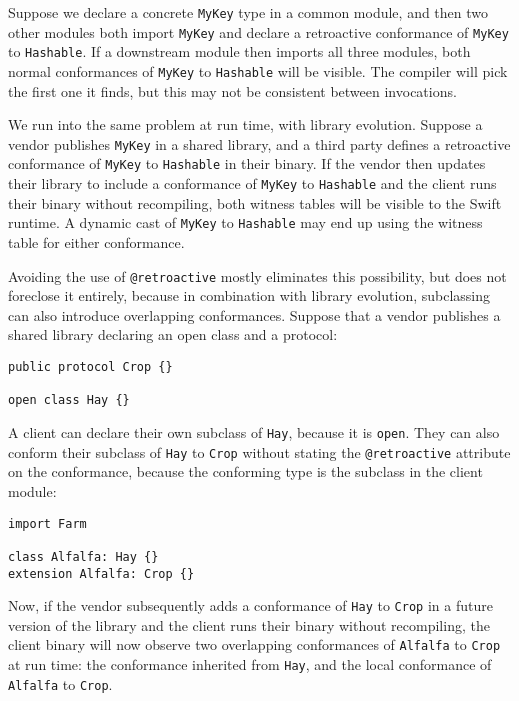\documentclass[../generics]{subfiles}
\begin{document}
Suppose we declare a concrete \texttt{MyKey} type in a common module, and then two other modules both import \texttt{MyKey} and declare a retroactive conformance of \texttt{MyKey} to \texttt{Hashable}. If a downstream module then imports all three modules, both normal conformances of \texttt{MyKey} to \texttt{Hashable} will be visible. The compiler will pick the first one it finds, but this may not be consistent between invocations.

We run into the same problem at run time, with library evolution. Suppose a vendor publishes \texttt{MyKey} in a shared library, and a third party defines a retroactive conformance of \texttt{MyKey} to \texttt{Hashable} in their binary. If the vendor then updates their library to include a conformance of \texttt{MyKey} to \texttt{Hashable} and the client runs their binary without recompiling, both witness tables will be visible to the Swift runtime. A dynamic cast of \texttt{MyKey} to \texttt{Hashable} may end up using the witness table for either conformance.

Avoiding the use of \verb|@retroactive| mostly eliminates this possibility, but does not foreclose it entirely, because in combination with library evolution, subclassing can also introduce overlapping conformances. Suppose that a vendor publishes a shared library declaring an open class and a protocol:
\begin{Verbatim}
public protocol Crop {}

open class Hay {}
\end{Verbatim}
A client can declare their own subclass of \texttt{Hay}, because it is \texttt{open}. They can also conform their subclass of \texttt{Hay} to \texttt{Crop} without stating the \verb|@retroactive| attribute on the conformance, because the conforming type is the subclass in the client module:
\begin{Verbatim}
import Farm

class Alfalfa: Hay {}
extension Alfalfa: Crop {}
\end{Verbatim}
Now, if the vendor subsequently adds a conformance of \texttt{Hay} to \texttt{Crop} in a future version of the library and the client runs their binary without recompiling, the client binary will now observe two overlapping conformances of \texttt{Alfalfa} to \texttt{Crop} at run time: the conformance inherited from \texttt{Hay}, and the local conformance of \texttt{Alfalfa} to \texttt{Crop}.
\end{document}
